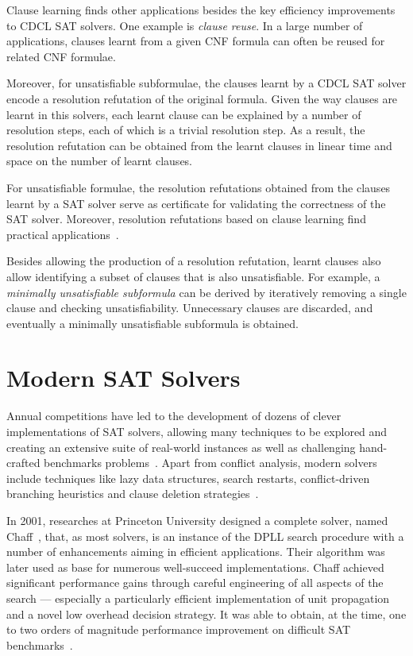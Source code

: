 Clause learning finds other applications besides the key efficiency improvements
to CDCL SAT solvers. One example is \emph{clause reuse}. In a large number of
applications, clauses learnt from a given CNF formula can often be reused for
related CNF formulae. 

Moreover, for unsatisfiable subformulae, the clauses learnt by a CDCL SAT solver
encode a resolution refutation of the original formula. Given the way clauses
are learnt in this solvers, each learnt clause can be explained by a number of
resolution steps, each of which is a trivial resolution step. As a result, the
resolution refutation can be obtained from the learnt clauses in linear time and
space on the number of learnt clauses. 

For unsatisfiable formulae, the resolution refutations obtained from the clauses
learnt by a SAT solver serve as certificate for validating the correctness of
the SAT solver. Moreover, resolution refutations based on clause learning find
practical applications~\cite{cdclchapter}.

Besides allowing the production of a resolution refutation, learnt clauses also
allow identifying a subset of clauses that is also unsatisfiable. For example, a
\emph{minimally unsatisfiable subformula} can be derived by iteratively removing
a single clause and checking unsatisfiability. Unnecessary clauses are
discarded, and eventually a minimally unsatisfiable subformula is obtained.

\section{Modern SAT Solvers}%

Annual competitions have led to the development of dozens of clever
implementations of SAT solvers, allowing many techniques to be explored and
creating an extensive suite of real-world instances as well as challenging
hand-crafted benchmarks problems~\cite{satchapter}. Apart from conflict
analysis, modern solvers include techniques like lazy data structures, search
restarts, conflict-driven branching heuristics and clause deletion
strategies~\cite{cdclchapter}.  

In 2001, researches at Princeton University designed a complete solver, named
Chaff~\cite{moskewicz2001chaff}, that, as most solvers, is an instance of the
DPLL search procedure with a number of enhancements aiming in efficient applications.
Their algorithm was later used as base for numerous well-succeed
implementations. Chaff achieved significant performance gains through careful
engineering of all aspects of the search --- especially a particularly efficient
implementation of unit propagation and a novel low overhead decision strategy.
It was able to obtain, at the time, one to two orders of magnitude performance
improvement on difficult SAT benchmarks~\cite{moskewicz2001chaff}.

